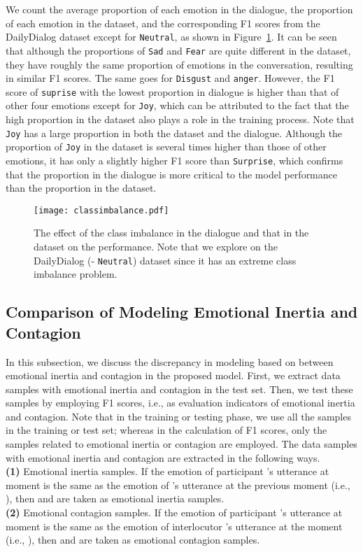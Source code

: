 \documentclass{SCIS2019}
\begin{document}
We count the average proportion of each emotion in the dialogue, the proportion of each emotion in the dataset, and the corresponding F1 scores from the DailyDialog dataset except for \texttt{Neutral}, as shown in Figure~\ref{fig:classimbalance}. It can be seen that although the proportions of \texttt{Sad} and \texttt{Fear} are quite different in the dataset, they have roughly the same proportion of emotions in the conversation, resulting in similar F1 scores. The same goes for \texttt{Disgust} and \texttt{anger}. However, the F1 score of \texttt{suprise} with the lowest proportion in dialogue is higher than that of other four emotions except for \texttt{Joy}, which can be attributed to the fact that the high proportion in the dataset also plays a role in the training process. Note that \texttt{Joy} has a large proportion in both the dataset and the dialogue. Although the proportion of \texttt{Joy} in the dataset is several times higher than those of other emotions, it has only a slightly higher F1 score than \texttt{Surprise}, which confirms that the proportion in the dialogue is more critical to the model performance than the proportion in the dataset.
\begin{figure}[htbp]
	\centering
	\texttt{[image: classimbalance.pdf]}
	\caption{The effect of the class imbalance in the dialogue and that in the dataset on the performance. Note that we explore on the DailyDialog (- \texttt{Neutral}) dataset since it has an extreme class imbalance problem.}
	\label{fig:classimbalance}	
\end{figure}

\subsection{Comparison of Modeling Emotional Inertia and Contagion}
In this subsection, we discuss the discrepancy in modeling based on between emotional inertia and contagion in the proposed model. First, we extract data samples with emotional inertia and contagion in the test set. Then, we test these samples by employing F1 scores, i.e., as evaluation indicators of emotional inertia and contagion. Note that in the training or testing phase, we use all the samples in the training or test set; whereas in the calculation of F1 scores, only the samples related to emotional inertia or contagion are employed. The data samples with emotional inertia and contagion are extracted in the following ways. 
\\ \noindent 
\textbf{(1)} Emotional inertia samples. If the emotion  of participant 's utterance  at moment  is the same as the emotion  of 's utterance  at the previous moment  (i.e., ), then  and  are taken as emotional inertia samples. 
\\ \noindent 
\textbf{(2)} Emotional contagion samples. If the emotion  of participant 's utterance  at moment  is the same as the emotion  of interlocutor 's utterance  at the moment  (i.e., ), then  and  are taken as emotional contagion samples. 
\end{document}
